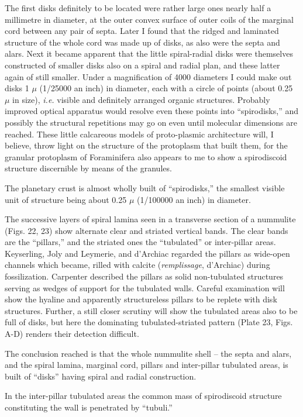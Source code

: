 \documentclass[a4paper, 12pt, oneside]{article}
\begin{document}
The first disks definitely to be located were rather large ones nearly half a millimetre in diameter, at the outer convex surface of outer coils of the marginal cord between any pair of septa. Later I found that the ridged and laminated structure of the whole cord was made up of disks, as also were the septa and alars. Next it became apparent that the little spiral-radial disks were themselves constructed of smaller disks also on a spiral and radial plan, and these latter again of still smaller. Under a magnification of 4000 diameters I could make out disks 1 $\mu$ (1/25000 an inch) in diameter, each with a circle of points (about 0.25 $\mu$ in size), \emph{i.e.} visible and definitely arranged organic structures. Probably improved optical apparatus would resolve even these points into ``spirodisks,'' and possibly the structural repetitions may go on even until molecular dimensions are reached. These little calcareous models of proto-plasmic architecture will, I believe, throw light on the structure of the protoplasm that built them, for the granular protoplasm of Foraminifera also appears to me to show a spirodiscoid structure discernible by means of the granules.

The planetary crust is almost wholly built of ``spirodisks,'' the smallest visible unit of structure being about 0.25 $\mu$ (1/100000 an inch) in diameter.

The successive layers of spiral lamina seen in a transverse section of a nummulite (Figs. 22, 23) show alternate clear and striated vertical bands. The clear bands are the ``pillars,'' and the striated ones the ``tubulated'' or inter-pillar areas. Keyserling, Joly and Leymerie, and d'Archiac regarded the pillars as wide-open channels which became, rilled with calcite (\emph{remplissage}, d'Archiac) during fossilization. Carpenter described the pillars as solid non-tubulated structures serving as wedges of support for the tubulated walls. Careful examination will show the hyaline and apparently structureless pillars to be replete with disk structures. Further, a still closer scrutiny will show the tubulated areas also to be full of disks, but here the dominating tubulated-striated pattern (Plate 23, Figs. A-D) renders their detection difficult.

The conclusion reached is that the whole nummulite shell -- the septa and alars, and the spiral lamina, marginal cord, pillars and inter-pillar tubulated areas, is built of ``disks'' having spiral and radial construction.

In the inter-pillar tubulated areas the common mass of spirodiscoid structure constituting the wall is penetrated by ``tubuli.''
\end{document}
